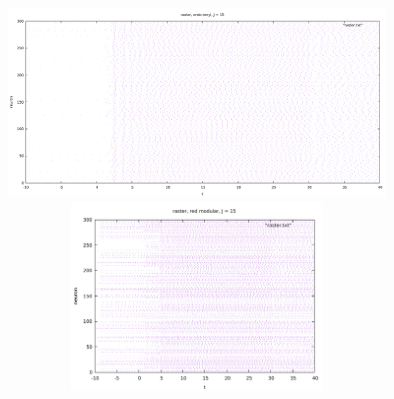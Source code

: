 \documentclass[a4paper]{article}
\begin{document}
\includegraphics[width=10cm,height=5cm]{erdos_raster_J15.pdf}\\
\includegraphics[width=10cm,height=5cm]{modular_raster_J15.pdf}\\
\end{document}
